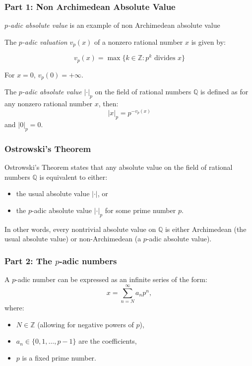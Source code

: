 \documentclass{beamer}
\begin{document}
\begin{frame}
    \frametitle{Part 1: Non Archimedean Absolute Value}
    \textit{\( p \)-adic absolute value} is an example of non Archimedean absolute value
    \begin{definition}
        The \textit{\( p \)-adic valuation} \( v_p(x) \) of a nonzero rational number \( x \) is given by:
        
        \[ v_p(x) = \max \{ k \in \mathbb{Z} : p^k \text{ divides } x \} \]
        
        For \( x = 0 \), \( v_p(0) = +\infty \).
    \end{definition}
    \begin{definition}
        The \textit{\( p \)-adic absolute value} \( |\cdot|_p \) on the field of rational numbers \( \mathbb{Q} \) is defined as for any nonzero rational number \( x \), then:
        \[
            |x|_p = p^{-v_p(x)}
        \]
        and \( |0|_p = 0 \).
    \end{definition}
\end{frame}

\begin{frame}
    \frametitle{Ostrowski's Theorem}
    \begin{theorem}
        	{Ostrowski's Theorem} states that any absolute value on the field of rational numbers \( \mathbb{Q} \) is equivalent to either:
        
        \begin{itemize}
            \item the usual absolute value \( |\cdot| \), or
            \item the \( p \)-adic absolute value \( |\cdot|_p \) for some prime number \( p \).
        \end{itemize}
        
        In other words, every nontrivial absolute value on \( \mathbb{Q} \) is either Archimedean (the usual absolute value) or non-Archimedean (a \( p \)-adic absolute value).
    \end{theorem}
\end{frame}

\begin{frame}
    \frametitle{Part 2: The \( p \)-adic numbers}
    \begin{definition}
        A \( p \)-adic number can be expressed as an infinite series of the form:
        \[
            x = \sum_{n=N}^\infty a_n p^n,
        \]
        where:
        \begin{itemize}
            \item \( N \in \mathbb{Z} \) (allowing for negative powers of \( p \)),
            \item \( a_n \in \{0, 1, \ldots, p-1\} \) are the coefficients,
            \item \( p \) is a fixed prime number.
        \end{itemize}
    \end{definition}
\end{frame}
\end{document}
